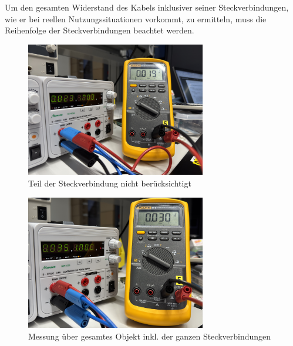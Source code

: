 \documentclass[a4paper,12pt]{article}
\begin{document}
\noindent Um den gesamten Widerstand des Kabels inklusiver seiner Steckverbindungen, wie er bei reellen Nutzungssituationen vorkommt, zu ermitteln, muss die Reihenfolge der Steckverbindungen beachtet werden. 

\begin{figure}[H]
    \centering
    \includegraphics[width=0.7\textwidth]{../Quellen/Labor2/Fotos/IMG_3983.jpeg}
\caption{Teil der Steckverbindung nicht berücksichtigt}
\end{figure}

\begin{figure}[H]
    \centering
    \includegraphics[width=0.7\textwidth]{../Quellen/Labor2/Fotos/IMG_3982.jpeg}
\caption{Messung über gesamtes Objekt inkl. der ganzen Steckverbindungen}
\end{figure}
\end{document}
